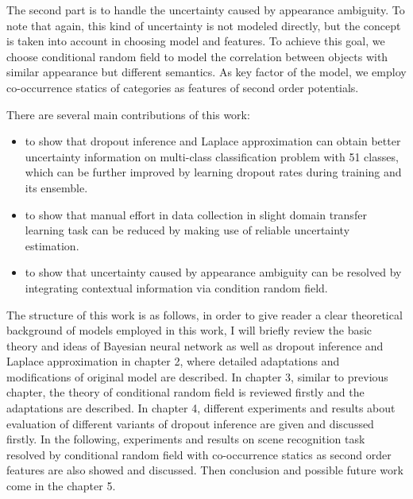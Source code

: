 The second part is to handle the uncertainty caused by appearance ambiguity. To note that again, this kind of uncertainty is not modeled directly, but the concept is taken into account in choosing model and features. To achieve this goal, we choose conditional random field to model the correlation between objects with similar appearance but different semantics. As key factor of the model, we employ co-occurrence statics of categories as features of second order potentials.

There are several main contributions of this work:
\begin{itemize}
 \item to show that dropout inference and Laplace approximation can obtain better uncertainty information on multi-class classification problem with 51 classes, which can be further improved by learning dropout rates during training and its ensemble.
 
 \item to show that manual effort in data collection in slight domain transfer learning task can be reduced by making use of reliable uncertainty estimation.
 
 \item to show that uncertainty caused by appearance ambiguity can be resolved by integrating contextual information via condition random field.
 
 
\end{itemize}

The structure of this work is as follows, in order to give reader a clear theoretical background of models employed in this work, I will briefly review the basic theory and ideas of Bayesian neural network as well as dropout inference and Laplace approximation in chapter 2, where detailed adaptations and modifications of original model are described. In chapter 3, similar to previous chapter, the theory of conditional random field is reviewed firstly and the adaptations are described. In chapter 4, different experiments and results about evaluation of different variants of dropout inference are given and discussed firstly. In the following, experiments and results on scene recognition task resolved by conditional random field with co-occurrence statics as second order features are also showed and discussed. Then conclusion and possible future work come in the chapter 5.